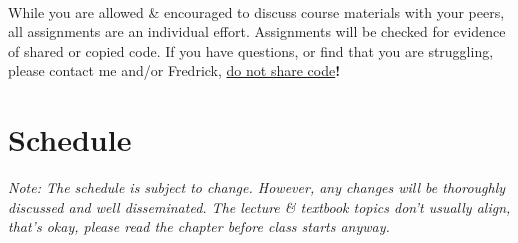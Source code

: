 \documentclass[letter,11pt]{article}
\begin{document}
\paragraph{}While you are allowed \& encouraged to discuss course materials with your peers, all assignments are an individual effort. Assignments will be checked for evidence of shared or copied code. If you have questions, or find that you are struggling, please contact me and/or Fredrick, \underline{do not share code}\textbf{!}

\section*{Schedule}
\textit{Note: The schedule is subject to change. However, any changes will be thoroughly discussed and well disseminated. The lecture \& textbook topics don't usually align, that's okay, please read the chapter before class starts anyway.}
\end{document}
